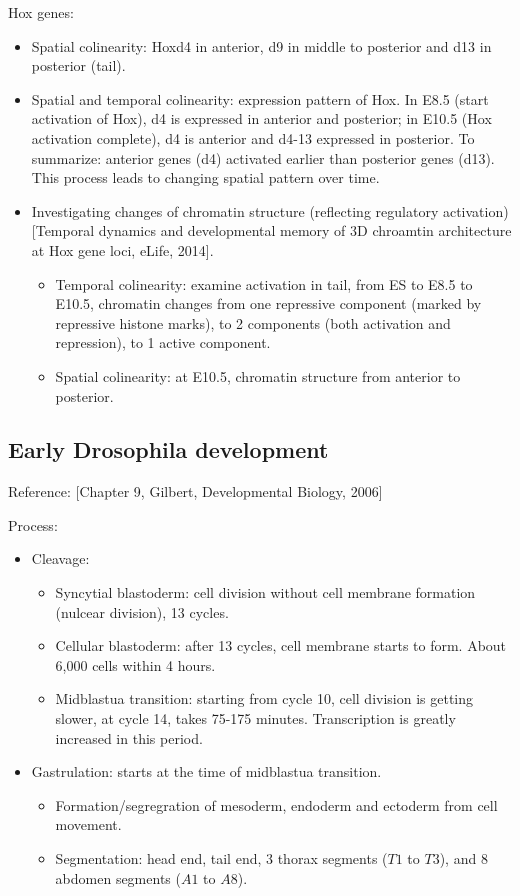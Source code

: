 \documentclass{report}
\begin{document}
Hox genes: 
\begin{itemize}
	\item Spatial colinearity: Hoxd4 in anterior, d9 in middle to posterior and d13 in posterior (tail). 
	
	\item Spatial and temporal colinearity: expression pattern of Hox. In E8.5 (start activation of Hox), d4 is expressed in anterior and posterior; in E10.5 (Hox activation complete), d4 is anterior and d4-13 expressed in posterior. To summarize: anterior genes (d4) activated earlier than posterior genes (d13). This process leads to changing spatial pattern over time. 
	
	\item Investigating changes of chromatin structure (reflecting regulatory activation) [Temporal dynamics and developmental memory of 3D chroamtin architecture at Hox gene loci, eLife, 2014]. 
	\begin{itemize}
		\item Temporal colinearity: examine activation in tail, from ES to E8.5 to E10.5, chromatin changes from one repressive component (marked by repressive histone marks), to 2 components (both activation and repression), to 1 active component. 
		\item Spatial colinearity: at E10.5, chromatin structure from anterior to posterior. 
	\end{itemize}
\end{itemize}

\subsection{Early Drosophila development} 

Reference: [Chapter 9, Gilbert, Developmental Biology, 2006]

Process:
\begin{itemize}
\item Cleavage: 
\begin{itemize}
\item Syncytial blastoderm: cell division without cell membrane formation (nulcear division), 13 cycles.  
\item Cellular blastoderm: after 13 cycles, cell membrane starts to form. About 6,000 cells within 4 hours. 
\item Midblastua transition: starting from cycle 10, cell division is getting slower, at cycle 14, takes 75-175 minutes. Transcription is greatly increased in this period. 
\end{itemize}
\item Gastrulation: starts at the time of midblastua transition. 
\begin{itemize}
\item Formation/segregration of mesoderm, endoderm and ectoderm from cell movement. 
\item Segmentation: head end, tail end, 3 thorax segments ($T1$ to $T3$), and 8 abdomen segments ($A1$ to $A8$). 
\end{itemize} 
\end{itemize}
\end{document}
